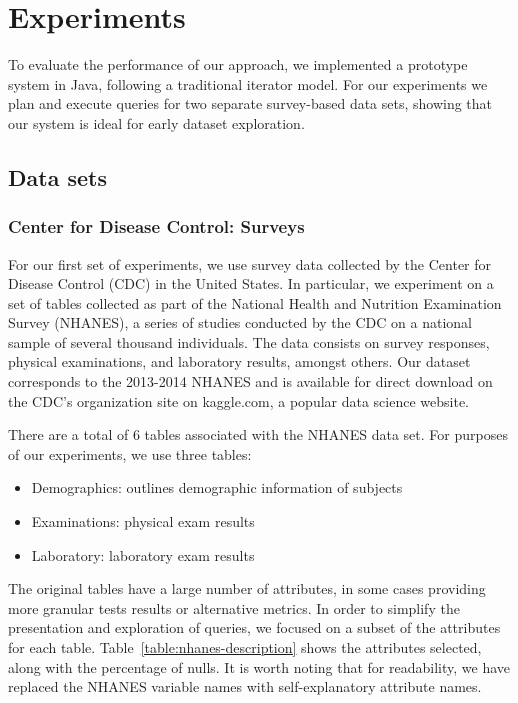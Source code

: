\section{Experiments}
To evaluate the performance of our approach,  we implemented
a prototype system in Java, following a traditional iterator model.
For our experiments we plan and execute queries
for two separate survey-based data sets, showing that our system
is ideal for early dataset exploration.

\subsection{Data sets} \label{subsec:datasets}
\subsubsection{Center for Disease Control: Surveys}
For our first set of experiments, we use survey data collected by the 
Center for Disease Control (CDC) in the United States. In particular, we
experiment on a set of tables collected as part of the National
Health and Nutrition Examination Survey (NHANES), a series of studies
conducted by the CDC on a national sample of several thousand individuals\cite{cdc-data}.
The data consists on survey responses, physical examinations, and laboratory
results, amongst others. Our dataset corresponds to the 2013-2014 NHANES
and is available for direct download on the CDC's organization site on 
kaggle.com, a popular data science website.

There are a total of 6 tables associated with the NHANES data set. For purposes
of our experiments, we use three tables:

\begin{itemize}
	\item Demographics: outlines demographic information of subjects
	\item Examinations: physical exam results
	\item Laboratory: laboratory exam results
\end{itemize}

The original tables have a large number of attributes, in some cases providing more granular
tests results or alternative metrics. In order to simplify the presentation and
exploration of queries, we focused on a subset of the attributes for each table.
Table~\ref{table:nhanes-description} shows the attributes selected, along with the
percentage of nulls. It is worth noting that for readability, we have replaced the
NHANES variable names with self-explanatory attribute names.

